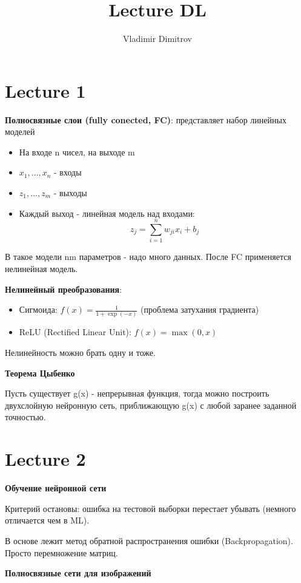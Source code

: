 \documentclass[a4paper,12pt]{article}
\author{Vladimir Dimitrov}
\title{Lecture DL}
\date{}
\begin{document}
	\maketitle
	\newpage
	\tableofcontents
	\newpage
	\section{Lecture 1}
	\textbf{Полносвязные слои (fully conected, FC)}: представляет набор линейных моделей
	\begin{itemize}
		\item На входе n чисел, на выходе m
		\item $x_1, \ldots, x_n$  - входы
		\item $z_1, \ldots, z_m$ - выходы
		\item Каждый выход - линейная модель над входами:
		$$
			z_{j}=\sum_{i=1}^{n} w_{j i} x_{i}+b_{j}
		$$
	\end{itemize} 
	
	В такое модели nm параметров - надо много данных. После FC применяется нелинейная модель.
	
	
	
	\textbf{Нелинейный преобразования}:
	\begin{itemize}
		\item Сигмоида: $f(x)=\frac{1}{1+\exp (-x)}$ (проблема затухания градиента)
		\item ReLU (Rectified Linear Unit): $f(x)=\max (0, x)$ 
		
	\end{itemize}
	
	Нелинейность можно брать одну и тоже.
	
	\textbf{Теорема Цыбенко}
	
	Пусть существует g(x) - непрерывная функция, тогда можно построить двухслойную нейронную сеть, приближающую g(x) с любой заранее заданной точностью. 
	
	\newpage
	\section{Lecture 2}
	\textbf{Обучение нейронной сети}
	
	Критерий остановы: ошибка на тестовой выборки перестает убывать (немного отличается чем в ML).
	
	В основе лежит метод обратной распространения ошибки (Backpropagation). Просто перемножение матриц.
	
	\textbf{Полносвязные сети для изображений}
	
\end{document}
